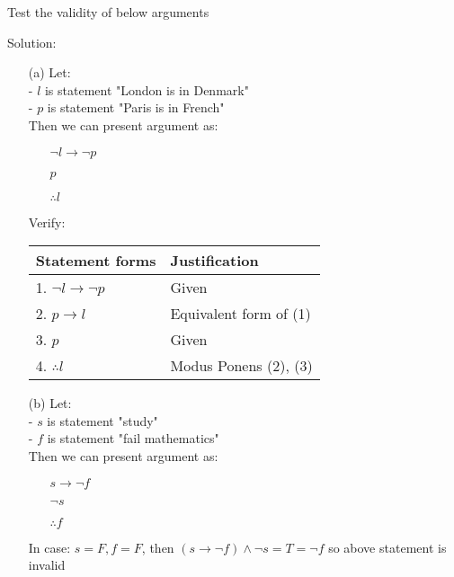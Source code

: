 \newpage
\begin{longfbox}
    \begin{bt} \label{pro:practice2.43}
        Test the validity of below arguments
    \end{bt}
\end{longfbox}
Solution:
\begin{enumerate}
    \item[(a)] Let: \\
        - $l$ is statement "London is in Denmark" \\
        - $p$ is statement "Paris is in French" \\
        Then we can present argument as:
        \begin{enumerate}
            \item[] $\neg l \rightarrow \neg p$
            \item[] $p$
            \item[] $\therefore l$
        \end{enumerate}
        Verify:
        \begin{table}[hbt!]
            \centering
            \begin{tabular}{|l | l|}
            \hline
            Statement forms & Justification\\ [0.5ex]
            \hline
                1. $\neg l \rightarrow \neg p$ & Given \\
                2. $p \rightarrow l$ & Equivalent form of (1) \\
                3. $p$ & Given \\
                4. $\therefore l$ & Modus Ponens (2), (3) \\
            \hline
            \end{tabular}
        \end{table}

    \item[(b)] Let: \\
        - $s$ is statement "study" \\
        - $f$ is statement "fail mathematics" \\
        Then we can present argument as:
        \begin{enumerate}
            \item[] $s \rightarrow \neg f$
            \item[] $\neg s$
            \item[] $\therefore f$
        \end{enumerate}
        In case: $s=F, f=F$, then $(s\rightarrow \neg f) \land \neg s= T = \neg f$ so above statement is invalid


\end{enumerate}
